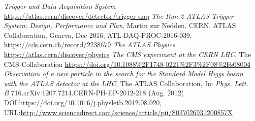 \documentclass[a4paper, oneside]{book}
\begin{document}
\begin{thebibliography}{32}
			\textit{Trigger and Data Acquisition System}
			\url{https://atlas.cern/discover/detector/trigger-daq}	
			\textit{The Run-2 ATLAS Trigger System: Design, Performance and
			Plan}, Martin zur Nedden, CERN, ATLAS Collaboration, Geneva, Dec 2016, ATL-DAQ-PROC-2016-039,
			\url{https://cds.cern.ch/record/2238679}
			\textit{The ATLAS Physics}
			\url{https://atlas.cern/discover/physics}
			\textit{The CMS experiment at the CERN LHC}, The CMS Collaboration
			\url{https://doi.org/10.1088%2F1748-0221%2F3%2F08%2Fs08004}
			\textit{Observation of a new particle in the search for the Standard Model Higgs boson with the ATLAS detector at the LHC},
			The ATLAS Collaboration, In: \textit{Phys. Lett. B} 716.arXiv:1207.7214.CERN-PH-EP-2012-218 (Aug. 2012) DOI:\url{https://doi.org/10.1016/j.physletb.2012.08.020}, URL:\url{http://www.sciencedirect.com/science/article/pii/S037026931200857X}
		 	

\end{thebibliography}
\end{document}
